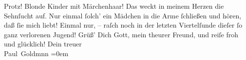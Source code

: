\begin{ledgroupsized}[t]{13cm}
               Protz! {\dotsfour}\pend
           \pstart
           Blonde Kinder mit Märchenhaar! Das weckt {\pb}in meinem
               Herzen die Sehnſucht auf. Nur einmal ſolch’ ein Mädchen in die Arme ſchließen und
               hören, daß ſie mich liebt! Einmal nur, – raſch noch in der letzten Viertelſunde
               dieſer ſo ganz verlorenen Jugend! {\dotsfour}\pend
           \pstart
           Grüß’ Dich Gott, mein theurer Freund, und reiſe froh und glücklich!\pend
           \pstart
           Dein treuer {\\[\baselineskip]}\spacefill\mbox{Paul Goldmnn}\pend
           \leftskip=0em{}
         
         \endnumbering{}\end{ledgroupsized}  \newcommand{\dateiname}{L02781}\newcommand{\titel}{Paul Goldmann an Arthur Schnitzler, 14. 7. [1896]}\newcommand{\editorInnen}{Martin Anton Müller und Laura Untner}
      